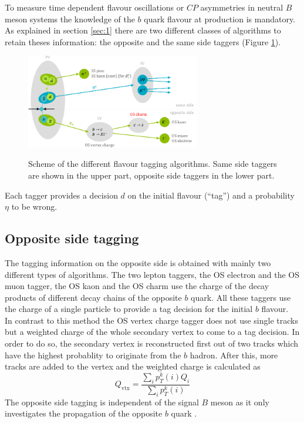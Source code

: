 \documentclass{PoS}
\begin{document}
To measure time dependent flavour oscillations or $C\!P$ asymmetries in neutral $B$ meson systems the knowledge of the $b$ quark flavour at production is mandatory. As explained in section \ref{sec:1} there are two different classes of algorithms to retain theses information: the opposite and the same side taggers (Figure \ref{fig:flavtagscheme}).
\begin{figure}[htbp]
	\begin{center}
		\includegraphics[width=0.68\textwidth, angle=0]{figs/FlavourTaggerScheme.pdf}
		\small{\caption{Scheme of the different flavour tagging algorithms. Same side taggers are shown in the upper part, opposite side taggers in the lower part.}}
		\label{fig:flavtagscheme}
	\end{center}
\end{figure}
Each tagger provides a decision $d$ on the initial flavour (\enquote{tag}) and a probability $\eta$ to be wrong.

\subsection{Opposite side tagging}\label{sec:OStagging}

The tagging information on the opposite side is obtained with mainly two different types of algorithms. The two lepton taggers, the OS electron and the OS muon tagger, the OS kaon and the OS charm use the charge of the decay products of different decay chains of the opposite $b$ quark. All these taggers use the charge of a single particle to provide a tag decision for the initial $b$ flavour.\\
In contrast to this method the OS vertex charge tagger does not use single tracks but a weighted charge of the whole secondary vertex to come to a tag decision. In order to do so, the secondary vertex is reconstructed first out of two tracks which have the highest probablity to originate from the $b$ hadron. After this, more tracks are added to the vertex and the weighted charge is calculated as
\begin{equation}
Q_\text{vtx}=\frac{\sum_i p_T^k(i)Q_i}{\sum_i p_T^k(i)}
\end{equation}  
The opposite side tagging is independent of the signal $B$ meson as it only investigates the propagation of the opposite $b$ quark \cite{1}.
\end{document}
